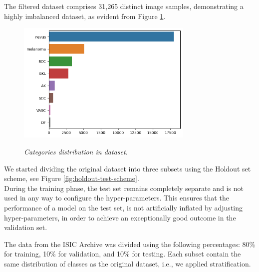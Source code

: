 The filtered dataset comprises 31,265 distinct image samples, demonstrating a
highly imbalanced dataset, as evident from Figure
\ref{fig:hole-dataset-distribution}.

\begin{figure}[H]
  \centering
  \includegraphics[width=0.75\textwidth]{imatges/data-training-strategies/hole-dataset-diagnosis.png}
  \caption[Categories distribution in dataset]{\textit{Categories distribution in dataset.}}
  {\label{fig:hole-dataset-distribution}}
\end{figure}


We started dividing the original dataset into three subsets using the Holdout
set scheme, see Figure \ref{fig:holdout-test-scheme}. \\

During the training phase, the test set remains completely separate and is not
used in any way to configure the hyper-parameters. This ensures that the
performance of a model on the test set, is not artificially inflated by
adjusting hyper-parameters, in order to achieve an exceptionally good outcome
in the validation set. \\

\newpage

The data from the ISIC Archive was divided using the following percentages: 80\%
for training, 10\% for validation, and 10\% for testing. Each subset contain the same
distribution of classes as the original dataset, i.e., we applied stratification.

